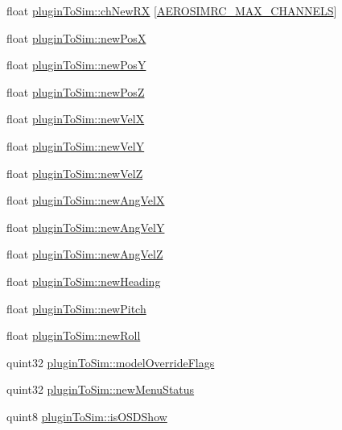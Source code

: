 \begin{DoxyCompactItemize}
\item 
float \hyperlink{group___aero_sim_r_c_gaa465d9eaa30d7a906bd3672768e5b380}{plugin\-To\-Sim\-::ch\-New\-R\-X} \mbox{[}\hyperlink{group___aero_sim_r_c_ga63f989ac10cdcbfefadc5e65055d3c7d}{\-A\-E\-R\-O\-S\-I\-M\-R\-C\-\_\-\-M\-A\-X\-\_\-\-C\-H\-A\-N\-N\-E\-L\-S}\mbox{]}
\item 
float \hyperlink{group___aero_sim_r_c_ga2067141174f8fa27f36b9831b73b5668}{plugin\-To\-Sim\-::new\-Pos\-X}
\item 
float \hyperlink{group___aero_sim_r_c_gab0bd49c25f923d60f12c350160c63f4f}{plugin\-To\-Sim\-::new\-Pos\-Y}
\item 
float \hyperlink{group___aero_sim_r_c_ga85e01d3ec1ec3924a0482565262ccd80}{plugin\-To\-Sim\-::new\-Pos\-Z}
\item 
float \hyperlink{group___aero_sim_r_c_ga963869a7b3f6432a6b42f9f239de0ca8}{plugin\-To\-Sim\-::new\-Vel\-X}
\item 
float \hyperlink{group___aero_sim_r_c_ga4ef77620e6e374b2af2bbd4e0d88fcfe}{plugin\-To\-Sim\-::new\-Vel\-Y}
\item 
float \hyperlink{group___aero_sim_r_c_ga09bc17352168fa2e9b782170e27c7c2b}{plugin\-To\-Sim\-::new\-Vel\-Z}
\item 
float \hyperlink{group___aero_sim_r_c_gafd7e1d21996abb68824a65505d845744}{plugin\-To\-Sim\-::new\-Ang\-Vel\-X}
\item 
float \hyperlink{group___aero_sim_r_c_gafe0593ec5f2487320a352c0f8bcb2f2d}{plugin\-To\-Sim\-::new\-Ang\-Vel\-Y}
\item 
float \hyperlink{group___aero_sim_r_c_ga6e895029ebb998be74c53cea057e83cf}{plugin\-To\-Sim\-::new\-Ang\-Vel\-Z}
\item 
float \hyperlink{group___aero_sim_r_c_ga11677816070d9ac5bc78d2c45338c0ec}{plugin\-To\-Sim\-::new\-Heading}
\item 
float \hyperlink{group___aero_sim_r_c_gae5174be9526399eb834a21d1d1e996d1}{plugin\-To\-Sim\-::new\-Pitch}
\item 
float \hyperlink{group___aero_sim_r_c_ga83b167dd0c9161f47923432618fac9c4}{plugin\-To\-Sim\-::new\-Roll}
\item 
quint32 \hyperlink{group___aero_sim_r_c_ga0fc062ffe3e17dd8ae14a181fbb50c1f}{plugin\-To\-Sim\-::model\-Override\-Flags}
\item 
quint32 \hyperlink{group___aero_sim_r_c_ga17602d21cacd40328f97406fb577e7a7}{plugin\-To\-Sim\-::new\-Menu\-Status}
\item 
quint8 \hyperlink{group___aero_sim_r_c_ga35a2acc4730f500b87b19630f57c14ed}{plugin\-To\-Sim\-::is\-O\-S\-D\-Show}

\end{DoxyCompactItemize}
